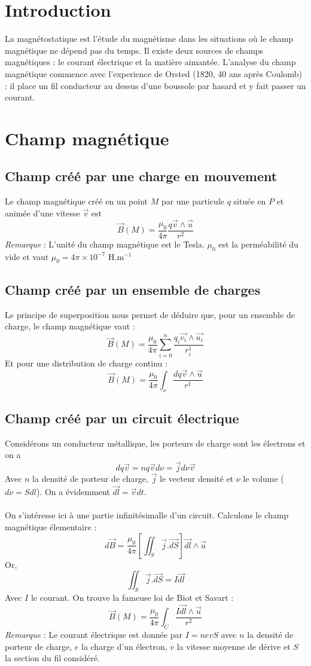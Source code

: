 \section{Introduction}

La magnétostatique est l'étude du magnétisme dans les situations où le champ magnétique ne dépend pas du temps. Il existe deux sources de champs magnétiques : le courant électrique et la matière aimantée. L'analyse du champ magnétique commence avec l'experience de Orsted (1820, 40 ans après Coulomb) : il place un fil conducteur au dessus d'une boussole par hasard et y fait passer un courant. 

\section{Champ magnétique}
\subsection{Champ créé par une charge en mouvement}

Le champ magnétique créé en un point $M$ par une particule $q$ située en $P$ et animée d'une vitesse $\vec{v}$ est 
\[ \vec{B}(M)=\frac{\mu_0}{4\pi}\frac{q\vec{v}\land\vec{u}}{r^2} \]
\emph{Remarque} : L'unité du champ magnétique est le Tesla. $\mu_0$ est la perméabilité du vide et vaut $\mu_0=4\pi\times 10^{-7}$ H.m$^{-1}$
\subsection{Champ créé par un ensemble de charges}
Le principe de superposition nous permet de déduire que, pour un ensemble de charge, le champ magnétique vaut :
\[ \vec{B}(M)=\frac{\mu_0}{4\pi}\sum_{i=0}^n\frac{q_i\vec{v_i}\land\vec{u_i}}{r_i^1} \]
Et pour une distribution de charge continu :
\[ \vec{B}(M)=\frac{\mu_0}{4\pi}\int_\nu\frac{dq\vec{v}\land\vec{u}}{r^1} \]

\subsection{Champ créé par un circuit électrique}

Considérons un conducteur métallique, les porteurs de charge sont les électrons et on a 
\[ dq\vec{v}=nq\vec{v}d\nu=\vec{j}d\nu\vec{v} \]
Avec $n$ la densité de porteur de charge, $\vec{j}$ le vecteur densité et $\nu$ le volume ($d\nu=Sdl$). On a évidemment $\vec{dl}=\vec{v}dt$. \\\\
\noindent On s'intéresse ici à une partie infinitésimalle d'un circuit. Calculons le champ magnétique élementaire :
\[ d\vec{B}=\frac{\mu_0}{4\pi}\left[\iint_S\vec{j}.\vec{dS}\right]\vec{dl}\land\vec{u} \]
Or, \[ \iint_S\vec{j}.\vec{dS}=I\vec{dl} \]
Avec $I$ le courant. On trouve la fameuse loi de Biot et Savart :
\[ \vec{B}(M)=\frac{\mu_0}{4\pi}\int_C\frac{I\vec{dl}\land\vec{u}}{r^2} \]
\emph{Remarque} : Le courant électrique est donnée par $I=nevS$ avec $n$ la densité de porteur de charge, $e$ la charge d'un électron, $v$ la vitesse moyenne de dérive et $S$ la section du fil considéré.

